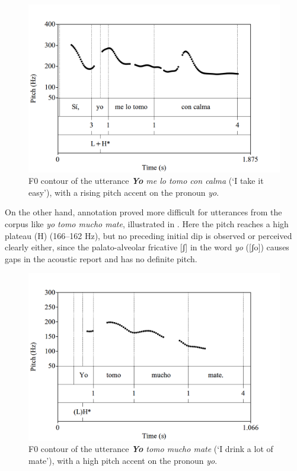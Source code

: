 \documentclass[output=paper]{langsci/langscibook}
\begin{document}
\begin{figure}[p]
\includegraphics[width=.9\textwidth]{figures/pes-img4.png}
\caption{F0 contour of the utterance \textit{\textbf{Yo} me lo tomo con calma} (‘I take it easy’), with a rising pitch accent on the pronoun \textit{yo}.\label{fig:pes:4}} 
\end{figure}
  
On the other hand,  annotation proved more difficult for utterances from the corpus like \textit{yo tomo mucho mate}, illustrated in . Here the pitch reaches a high plateau (H) (166–162 Hz), but no preceding initial dip is observed or perceived clearly either, since the  palato-alveolar fricative [ʃ] in the word \textit{yo} ([ʃo]) causes gaps in the acoustic report and has no definite pitch.

  

\begin{figure}[p]
\includegraphics[width=\textwidth]{figures/pes-img5.png}
\caption{F0 contour of the utterance \textit{\textbf{Yo} tomo mucho mate} (‘I drink a lot of mate’), with a high pitch accent on the pronoun \textit{yo}.\label{fig:pes:5}}
  \end{figure}
  
\end{document}
